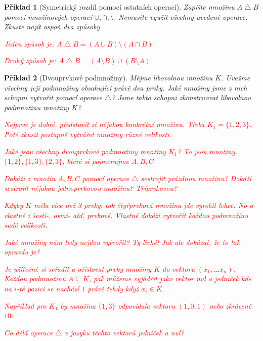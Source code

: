 \documentclass[10pt]{article}
\theoremstyle{definitionstyle}
\theoremstyle{problemstyle}
\newtheorem{problem}{Příklad}
\begin{document}
\begin{problem}[Symetrický rozdíl pomocí ostatních operací]
Zapište množinu $A \bigtriangleup B$ pomocí množinových operací $\cup, \cap, \setminus$. Nemusíte využít všechny uvedené operace. Zkuste najít aspoň dva způsoby.

\textcolor{red}{Jeden způsob je: $A \bigtriangleup B = (A \cup B) \setminus (A \cap B)$}

\textcolor{red}{Druhý způsob je: $A \bigtriangleup B = (A \setminus B) \cup (B \setminus A)$}
\end{problem}

\begin{problem}[Dvouprvkové podmnožiny]
Mějme libovolnou množinu $K$. Uvažme všechny její podmnožiny obsahující právě dva prvky. Jaké množiny jsme z nich schopni vytvořit pomocí operace $\bigtriangleup$? Jsme takto schopni zkonstruovat libovolnou podmnožinu množiny $K$?


\textcolor{red}{Nejprve je dobré, představit si nějakou konkrétní množinu. Třeba $K_1 = \{1,2,3\}$. Poté zkusit postupně vytvářet množiny různé velikosti. }

\textcolor{red}{Jaké jsou všechny dvouprvkové podmnožiny množiny $K_1$? To jsou množiny $\{1,2\},\{1,3\},\{2,3\}$, které si pojmenujme $A,B,C$}


\textcolor{red}{Dokáži z množin $A,B,C$ pomocí operace $\bigtriangleup$ sestrojit prázdnou množinu? Dokáží sestrojit nějakou jednoprvkovou množinu? Tříprvkovou?}

\textcolor{red}{Kdyby $K$ měla více než 3 prvky, tak čtyřprvková množina jde vyrobit lehce. No a vlastně i šesti-, osmi- atd. prvkové. Vlastně dokáži vytvořit každou podmnožinu sudé velikosti.}

\textcolor{red}{Jaké množiny nám tedy nejdou vytvořit? Ty liché! Jak ale dokázat, že to tak opravdu je?}

\textcolor{red}{Je užitečné si seřadit a očíslovat prvky množiny $K$ do vektoru $(x_1, \ldots x_n)$. Každou podmnožinu $A \subseteq K$, pak můžeme vyjádřit jako vektor nul a jedniček kde na $i$-té pozici se nachází $1$ právě tehdy když $x_i \in K$.}

\textcolor{red}{Například pro $K_1$ by množina $\{ 1, 3\}$ odpovídala vektoru $(1,0,1)$ nebo zkráceně $101$.}

\textcolor{red}{Co dělá operace $\bigtriangleup$ v jazyku těchto vektorů jedniček a nul? }


\end{problem}
\end{document}
